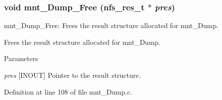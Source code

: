 \subsubsection[{mnt\_\-Dump\_\-Free}]{\setlength{\rightskip}{0pt plus 5cm}void mnt\_\-Dump\_\-Free (nfs\_\-res\_\-t $\ast$ {\em pres})}\label{mnt__Dump_8c_ad835adce5166476b3899d71b4da4dc18}
mnt\_\-Dump\_\-Free: Frees the result structure allocated for mnt\_\-Dump.

Frees the result structure allocated for mnt\_\-Dump.


\begin{DoxyParams}{Parameters}
\item[{\em pres}][INOUT] Pointer to the result structure. \end{DoxyParams}


Definition at line 108 of file mnt\_\-Dump.c.